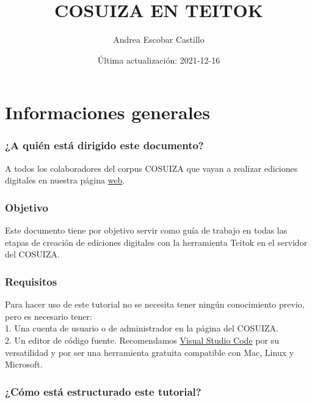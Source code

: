 \documentclass[
]{book}
\title{COSUIZA EN TEITOK}
\author{Andrea Escobar Castillo}
\date{Última actualización: 2021-12-16}
\begin{document}
\maketitle

{
\setcounter{tocdepth}{1}
\tableofcontents
}
\hypertarget{informaciones-generales}{%
\chapter*{Informaciones generales}\label{informaciones-generales}}

\hypertarget{a-quiuxe9n-estuxe1-dirigido-este-documento}{%
\subsection*{¿A quién está dirigido este documento?}\label{a-quiuxe9n-estuxe1-dirigido-este-documento}}

A todos los colaboradores del corpus COSUIZA que vayan a realizar ediciones digitales en nuestra página \href{https://cosuiza.unil.ch/}{web}.

\hypertarget{objetivo}{%
\subsection*{Objetivo}\label{objetivo}}

Este documento tiene por objetivo servir como guía de trabajo en todas las etapas de creación de ediciones digitales con la herramienta Teitok en el servidor del COSUIZA.

\hypertarget{requisitos}{%
\subsection*{Requisitos}\label{requisitos}}

Para hacer uso de este tutorial no se necesita tener ningún conocimiento previo, pero es necesario tener:\\
1. Una cuenta de usuario o de administrador en la página del COSUIZA.\\
2. Un editor de código fuente. Recomendamos \href{https://code.visualstudio.com/}{Visual Studio Code} por su versatilidad y por ser una herramienta gratuita compatible con Mac, Linux y Microsoft.

\hypertarget{cuxf3mo-estuxe1-estructurado-este-tutorial}{%
\subsection*{¿Cómo está estructurado este tutorial?}\label{cuxf3mo-estuxe1-estructurado-este-tutorial}}
\end{document}
